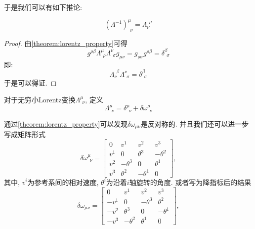 于是我们可以有如下推论:
\begin{theorem}[Lorentz变换的逆矩阵]\label{theorem:Lorentz_inverse}
    \begin{equation}
        (\Lambda^{-1})^{\mu}_{~~\nu}=\Lambda_\nu^{~~\mu}
    \end{equation}
\end{theorem}
\begin{proof}
    由\ref{theorem:lorentz_property}可得
    \begin{equation}
        g^{\rho\beta}\Lambda^\mu_{~~\rho}\Lambda^\nu_{~~\sigma}g_{\mu\nu}=g_{\rho\sigma}g^{\rho\beta}=\delta^\beta_{~~\sigma}
    \end{equation}
    即:
    \begin{equation}
        \Lambda_\nu^{~~\beta}\Lambda^\nu_{~~\sigma}=\delta^\beta_{~~\sigma}
    \end{equation}
    于是可以得证.
\end{proof}
\begin{definition}[$\delta\omega^\mu_{~~\nu}$]\label{def:deltaomega}
    对于无穷小Lorentz变换$\Lambda^\mu_{~~\nu}$, 定义
    \begin{equation}
        \Lambda^\mu_{~~\nu}=\delta^\mu_{~~\nu}+\delta\omega^\mu_{~~\nu}
    \end{equation}
\end{definition}
通过\eqref{theorem:lorentz_property}可以发现$\delta\omega_{\mu\nu}$是反对称的. 并且我们还可以进一步写成矩阵形式\:
\begin{equation}
    \delta\omega^\mu_{~~\nu}=\begin{bmatrix}
        0 & v^1 & v^2 & v^3 \\
        v^1 & 0 & \theta^3 & -\theta^2 \\
        v^2 & -\theta^3 & 0 & \theta^1 \\
        v^3 & \theta^2 & -\theta^1 & 0
    \end{bmatrix},
\end{equation}
其中, $v^i$为参考系间的相对速度, $\theta^i$为沿着$i$轴旋转的角度. 或者写为降指标后的结果
\begin{equation}
    \delta\omega_{\mu\nu}=\begin{bmatrix}
        0 & v^1 & v^2 & v^3 \\
        -v^1 & 0 & -\theta^3 & \theta^2 \\
        -v^2 & \theta^3 & 0 & -\theta^1\\
        -v^3 & -\theta^2 & \theta^1 & 0
    \end{bmatrix},
\end{equation}


